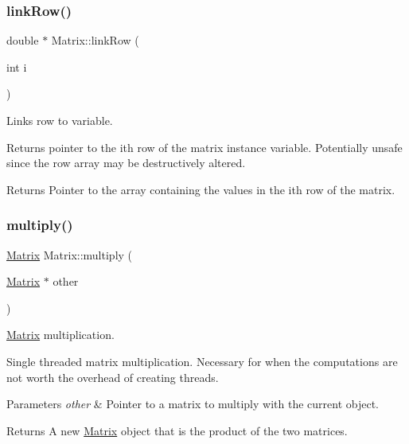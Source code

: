 \subsubsection{\texorpdfstring{link\+Row()}{linkRow()}}
{\footnotesize\ttfamily double $\ast$ Matrix\+::link\+Row (\begin{DoxyParamCaption}\item[{int}]{i }\end{DoxyParamCaption})}



Links row to variable. 

Returns pointer to the ith row of the matrix instance variable. Potentially unsafe since the row array may be destructively altered.

\begin{DoxyReturn}{Returns}
Pointer to the array containing the values in the ith row of the matrix. 
\end{DoxyReturn}
\mbox{\label{classMatrix_ac355ffa8b66de8a574c26cf14c2db8ca}} 
\subsubsection{\texorpdfstring{multiply()}{multiply()}}
{\footnotesize\ttfamily \hyperlink{classMatrix}{Matrix} Matrix\+::multiply (\begin{DoxyParamCaption}\item[{\hyperlink{classMatrix}{Matrix} $\ast$}]{other }\end{DoxyParamCaption})}



\hyperlink{classMatrix}{Matrix} multiplication. 

Single threaded matrix multiplication. Necessary for when the computations are not worth the overhead of creating threads.


\begin{DoxyParams}{Parameters}
{\em other} & Pointer to a matrix to multiply with the current object. \\
\hline
\end{DoxyParams}
\begin{DoxyReturn}{Returns}
A new \hyperlink{classMatrix}{Matrix} object that is the product of the two matrices. 
\end{DoxyReturn}
\mbox{\label{classMatrix_ae3695797299c70849667c22a098db137}} 
